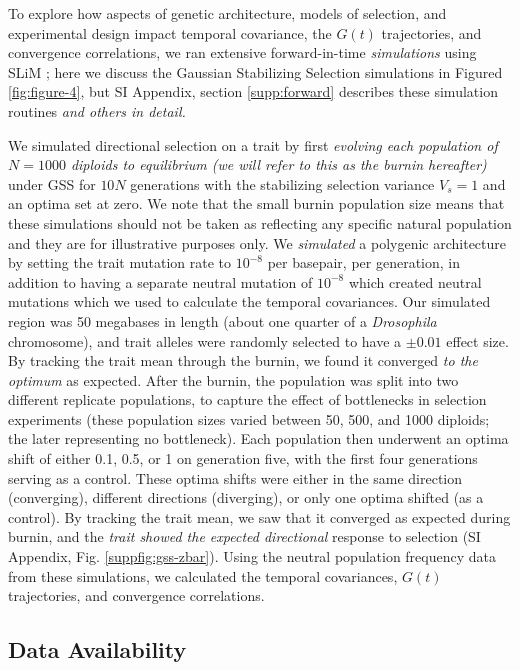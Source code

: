 \documentclass[9pt,twocolumn,twoside]{pnas-new}
\newcommand{\vb}[1]{{\it \color{red} #1}}
\begin{document}
{To explore how aspects of genetic architecture, models of selection, and
experimental design impact temporal covariance, the $G(t)$ trajectories, and
convergence correlations, we ran extensive forward-in-time \vb{simulations}
using SLiM \cite{Haller2019-vu}; here we discuss the Gaussian Stabilizing
Selection simulations in Figured \ref{fig:figure-4}, but SI Appendix, section
\ref{supp:forward} describes these simulation routines \vb{and others in detail.}

We simulated directional selection on a trait by first \vb{evolving each
population of $N=1000$ diploids to equilibrium (we will refer to this as the
burnin hereafter)} under GSS for $10N$ generations with the stabilizing
selection variance $V_s = 1$ and an optima set at zero. We note that the small
burnin population size means that these simulations should not be taken as
reflecting any specific natural population and they are for illustrative
purposes only.  We \vb{simulated} a polygenic architecture by setting the trait
mutation rate to $10^{-8}$ per basepair, per generation, in addition to having
a separate neutral mutation of $10^{-8}$ which created neutral mutations which
we used to calculate the temporal covariances. Our simulated region was 50
megabases in length (about one quarter of a \emph{Drosophila} chromosome), and
trait alleles were randomly selected to have a $\pm 0.01$ effect size. By
tracking the trait mean through the burnin, we found it converged \vb{to the
optimum} as expected.  After the burnin, the population was split into two
different replicate populations, to capture the effect of bottlenecks in
selection experiments (these population sizes varied between 50, 500, and 1000
diploids; the later representing no bottleneck). Each population then underwent
an optima shift of either 0.1, 0.5, or 1 on generation five, with the first
four generations serving as a control.  These optima shifts were either in the
same direction (converging), different directions (diverging), or only one
optima shifted (as a control). By tracking the trait mean, we saw that it
converged as expected during burnin, and the \vb{trait showed the expected
directional} response to selection (SI Appendix, Fig.  \ref{suppfig:gss-zbar}).
Using the neutral population frequency data from these simulations, we
calculated the temporal covariances, $G(t)$ trajectories, and convergence
correlations.

\subsection*{Data Availability} 

}
\end{document}
